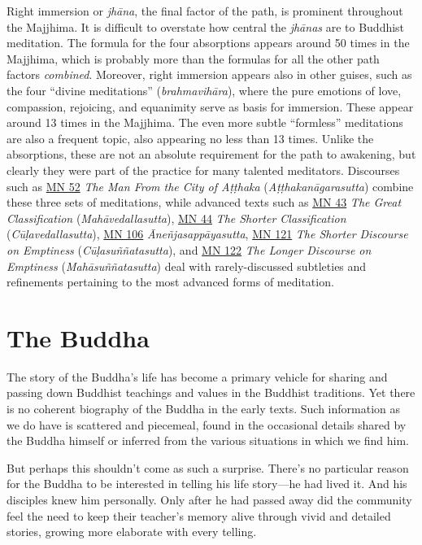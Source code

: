 \documentclass[12pt,openany]{book}%
\begin{document}
Right immersion or \emph{\textsanskrit{jhāna}}, the final factor of the path, is prominent throughout the Majjhima. It is difficult to overstate how central the \textit{\textsanskrit{jhānas}} are to Buddhist meditation. The formula for the four absorptions appears around 50 times in the Majjhima, which is probably more than the formulas for all the other path factors \emph{combined}. Moreover, right immersion appears also in other guises, such as the four “divine meditations” (\textit{\textsanskrit{brahmavihāra}}), where the pure emotions of love, compassion, rejoicing, and equanimity serve as basis for immersion. These appear around 13 times in the Majjhima. The even more subtle “formless” meditations are also a frequent topic, also appearing no less than 13 times. Unlike the absorptions, these are not an absolute requirement for the path to awakening, but clearly they were part of the practice for many talented meditators. Discourses such as \href{https://suttacentral.net/mn52}{MN 52} \textit{The Man From the City of \textsanskrit{Aṭṭhaka}} (\textit{\textsanskrit{Aṭṭhakanāgarasutta}}) combine these three sets of meditations, while advanced texts such as \href{https://suttacentral.net/mn43}{MN 43} \textit{The Great Classification} (\textit{\textsanskrit{Mahāvedallasutta}}), \href{https://suttacentral.net/mn44}{MN 44} \textit{The Shorter Classification} (\textit{\textsanskrit{Cūḷavedallasutta}}), \href{https://suttacentral.net/mn106}{MN 106} \textit{\textsanskrit{Āneñjasappāyasutta}}, \href{https://suttacentral.net/mn121}{MN 121} \textit{The Shorter Discourse on Emptiness} (\textit{\textsanskrit{Cūḷasuññatasutta}}), and \href{https://suttacentral.net/mn122}{MN 122} \textit{The Longer Discourse on Emptiness} (\textit{\textsanskrit{Mahāsuññatasutta}}) deal with rarely-discussed subtleties and refinements pertaining to the most advanced forms of meditation.

\section*{The Buddha}

The story of the Buddha’s life has become a primary vehicle for sharing and passing down Buddhist teachings and values in the Buddhist traditions. Yet there is no coherent biography of the Buddha in the early texts. Such information as we do have is scattered and piecemeal, found in the occasional details shared by the Buddha himself or inferred from the various situations in which we find him.

But perhaps this shouldn’t come as such a surprise. There’s no particular reason for the Buddha to be interested in telling his life story—he had lived it. And his disciples knew him personally. Only after he had passed away did the community feel the need to keep their teacher’s memory alive through vivid and detailed stories, growing more elaborate with every telling.
\end{document}
